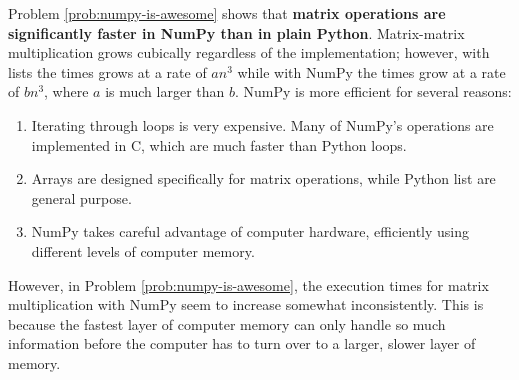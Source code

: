 \begin{info} %
Problem \ref{prob:numpy-is-awesome} shows that \textbf{matrix  operations are significantly faster in NumPy than in plain Python}.
Matrix-matrix multiplication grows cubically regardless of the implementation; however, with lists the times grows at a rate of $an^3$ while with NumPy the times grow at a rate of $bn^3$, where $a$ is much larger than $b$.
NumPy is more efficient for several reasons:
\begin{enumerate}
    \item Iterating through loops is very expensive.
    Many of NumPy's operations are implemented in C, which are much faster than Python loops.
    \item Arrays are designed specifically for matrix operations, while Python list are general purpose.
    \item NumPy takes careful advantage of computer hardware, efficiently using different levels of computer memory.
\end{enumerate}




However, in Problem \ref{prob:numpy-is-awesome}, the execution times for matrix multiplication with NumPy seem to increase somewhat inconsistently.
This is because the fastest layer of computer memory can only handle so much information before the computer has to turn over to a larger, slower layer of memory.

\end{info}

